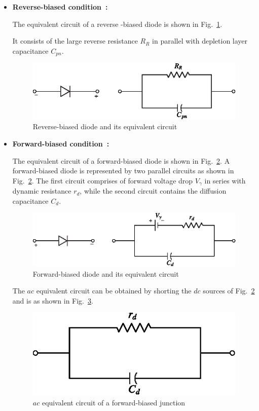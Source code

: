 \begin{itemize}
\item {\bf Reverse-biased condition~:}

The equivalent circuit of a reverse -biased diode is shown in
Fig.~\ref{fig1.18}.

It consists of the large reverse resistance $R_R$ in parallel with
depletion layer capacitance $C_{pn}$.
\begin{figure}[H]
\centering
\includegraphics{chap1/fig1.18.eps}
\caption{Reverse-biased diode and its equivalent circuit}\label{fig1.18}
\end{figure}

\item {\bf Forward-biased condition~:}

The equivalent circuit of a forward-biased diode is shown in
Fig.~\ref{fig1.19}. A forward-biased diode is represented by two parallel
circuits as shown in Fig.~\ref{fig1.19}. The first circuit comprises of forward
voltage drop $V_\gamma$ in series with dynamic resistance $r_d$, while
the second circuit contains the diffusion capacitance $C_d$.
\begin{figure}[H]
\centering
\includegraphics{chap1/fig1.19.eps}
\caption{Forward-biased diode and its equivalent circuit}\label{fig1.19}
\end{figure}

The $ac$ equivalent circuit can be obtained by shorting the $dc$
sources of Fig.~\ref{fig1.19} and is as shown in Fig.~\ref{fig1.20}.
\begin{figure}[H]
\centering
\includegraphics{chap1/fig1.20.eps}
\caption{$ac$ equivalent circuit of a forward-biased junction}\label{fig1.20}
\end{figure}
\end{itemize}


